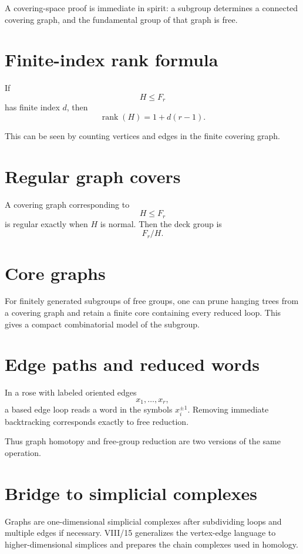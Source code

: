 A covering-space proof is immediate in spirit: a subgroup determines a
connected covering graph, and the fundamental group of that graph is free.

\section{Finite-index rank formula}

\begin{theorem}
\label{thm:viii14-schreier-formula}
If
\[
H\le F_r
\]
has finite index \(d\), then
\[
\operatorname{rank}(H)=1+d(r-1).
\]
\end{theorem}

This can be seen by counting vertices and edges in the finite covering graph.

\section{Regular graph covers}

A covering graph corresponding to
\[
H\le F_r
\]
is regular exactly when \(H\) is normal.  Then the deck group is
\[
F_r/H.
\]

\section{Core graphs}

For finitely generated subgroups of free groups, one can prune hanging trees
from a covering graph and retain a finite core containing every reduced loop.
This gives a compact combinatorial model of the subgroup.

\section{Edge paths and reduced words}

In a rose with labeled oriented edges
\[
x_1,\dots,x_r,
\]
a based edge loop reads a word in the symbols \(x_i^{\pm1}\).  Removing
immediate backtracking corresponds exactly to free reduction.

Thus graph homotopy and free-group reduction are two versions of the same
operation.

\section{Bridge to simplicial complexes}

Graphs are one-dimensional simplicial complexes after subdividing loops and
multiple edges if necessary.  VIII/15 generalizes the vertex-edge language to
higher-dimensional simplices and prepares the chain complexes used in homology.


